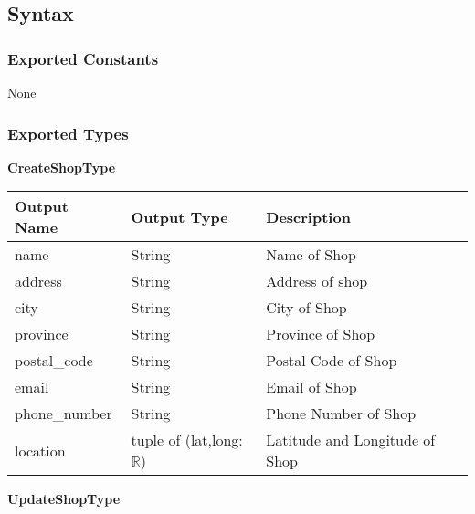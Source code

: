 \documentclass[12pt, titlepage]{article}
\begin{document}
\subsection{Syntax}

\subsubsection{Exported Constants}

None

\subsubsection{Exported Types}

\textbf{CreateShopType}

\begin{table}[H]
	\begin{tabular}{|p{}|p{}|p{}|}
		\hline
		\textbf{Output Name} & \textbf{Output Type}             & \textbf{Description}           \\
		\hline
		name                 & String                           & Name of Shop                   \\
		\hline
		address              & String                           & Address of shop                \\
		\hline
		city                 & String                           & City of Shop                   \\
		\hline
		province             & String                           & Province of Shop               \\
		\hline
		postal\_code         & String                           & Postal Code of Shop            \\
		\hline
		email                & String                           & Email of Shop                  \\
		\hline
		phone\_number        & String                           & Phone Number of Shop           \\
		\hline
		location             & tuple of (lat,long:$\mathbb{R}$) & Latitude and Longitude of Shop \\
		\hline
	\end{tabular}
\end{table}

\textbf{UpdateShopType}
\end{document}
